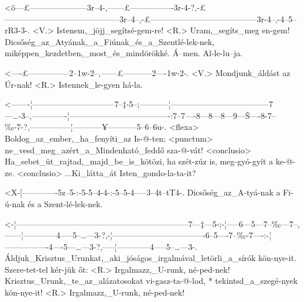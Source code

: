 
  {<ô---£---------------------3r--4-,------£----------------3r-4-?,-£------------------------------------------3r--4--,-£---------------------------------------3r-4--,-4--5--rR3-3-.}
  {<V.> Istenem,_jöjj_segítsé-gem-re! <R.> Uram,_segíts_meg en-gem! Dicsőség_az_Atyának,_a_Fiúnak_és_a_Szentlé-lek-nek, miképpen_kezdetben,_most_és_mindörökké. Á--men. Al-le-lu--ja.}

  {<----£---------------2--1w-2--,------£-----------2----1w-2-.}
  {<V.> Mondjunk_áldást az Úr-nak! <R.> Istennek_le-gyen há-la.}

  {<-------¦------------------------------7--‡-5--;-----------¦------------------------------------7---…-3--,-------------¦-------------------------------------:7--7----8---8---8---9---Š----8-7--‰-7-?,---------------¦-----------¥-----------5--6--6u-.}
  {<flexa> Boldog_az_ember,_ha_fenyíti_az Is-@-ten; <punctum> ne_vesd_meg_azért_a_Mindenható_feddő sza-@-vát! <conclusio> Ha_sebet_üt_rajtad,_majd_be_is_kötözi, ha szét-zúz is, meg-gyó-gyít a ke-@-ze. <conclusio> ...Ki_látta_át Isten_gondo-la-ta-it?}

  {<X-[-------------5z--5-:-5-5--4-4-:-5--5-4-----3--4t--tT4-.}
  {   Dicsőség_az_A-tyá-nak a Fi-ú-nak és a Szent-lé-lek-nek.}

  {<-¦---------------------------------------------------------------7---‡---5-;-¦-----6---5---7--‰---7--,------¦------------4-----5--…---3-?,-¦----------------------------------6--5----7--‰-7----:-¦----------------4----5---…---3-?,-----¦------------4-----5--…---3-.}
  {  Áldjuk_Krisztus_Urunkat,_aki_jóságos_irgalmával_letörli_a_sírók kön-nye-it. Szere-tet-tel kér-jük őt: <R.> Irgalmazz,_U-runk, né-ped-nek! Krisztus_Urunk,_te_az_alázatosokat vi-gasz-ta-@-lod, * tekintsd_a_szegé-nyek kön-nye-it! <R.> Irgalmazz,_U-runk, né-ped-nek! }



